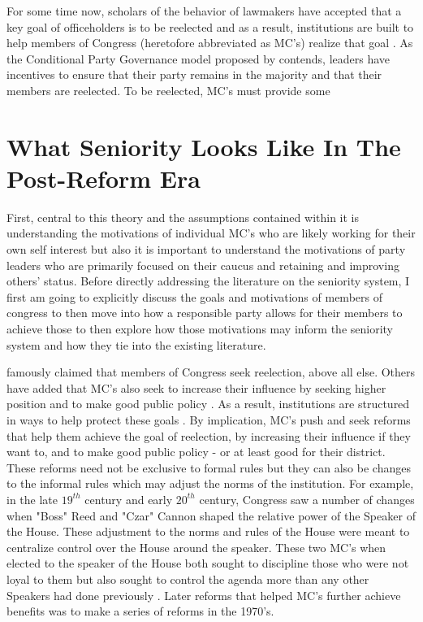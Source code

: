 \documentclass [12pt]{article}
\begin{document}
For some time now, scholars of the behavior of lawmakers have accepted that a key goal of officeholders is to be reelected and as a result, institutions are built to help members of Congress (heretofore abbreviated as MC's) realize that goal \cite{Mayhew1974}. As the Conditional Party Governance model proposed by \cite{Rohde1991a} contends, leaders have incentives to ensure that their party remains in the majority and that their members are reelected. To be reelected, MC's must provide some 

\section*{What Seniority Looks Like In The Post-Reform Era}

First, central to this theory and the assumptions contained within it is understanding the motivations of individual MC's who are likely working for their own self interest but also it is important to understand the motivations of party leaders who are primarily focused on their caucus and retaining and improving others' status. Before directly addressing the literature on the seniority system, I first am going to explicitly discuss the goals and motivations of members of congress to then move into how a responsible party allows for their members to achieve those to then explore how those motivations may inform the seniority system and how they tie into the existing literature.

 famously claimed that members of Congress seek reelection, above all else. Others have added that MC's also seek to increase their influence by seeking higher position and to make good public policy \cite{Fenno1973}. As a result, institutions are structured in ways to help protect these goals \cite{Mayhew1974}. By implication, MC's push and seek reforms that help them achieve the goal of reelection, by increasing their influence if they want to, and to make good public policy - or at least good for their district. These reforms need not be exclusive to formal rules but they can also be changes to the informal rules which may adjust the norms of the institution. For example, in the late $19^{th}$ century and early $20^{th}$ century, Congress saw a number of changes when "Boss" Reed and "Czar" Cannon shaped the relative power of the Speaker of the House. These adjustment to the norms and rules of the House were meant to centralize control over the House around the speaker. These two MC's when elected to the speaker of the House both sought to discipline those who were not loyal to them but also sought to control the agenda more than any other Speakers had done previously \cite{Cox2005}. Later reforms that helped MC's further achieve benefits was to make a series of reforms in the 1970's.
\end{document}
